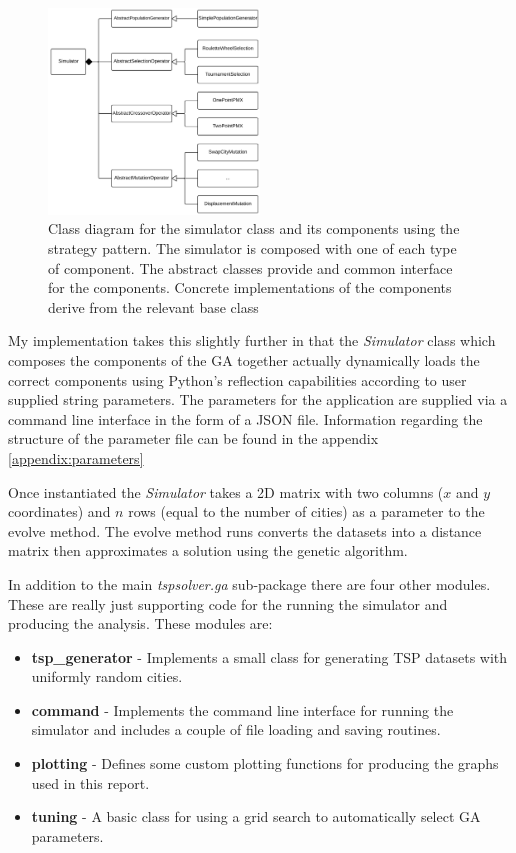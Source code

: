 \documentclass[journal]{IEEEtran}
\begin{document}
\begin{figure}[H]
\centering
\includegraphics[width=0.5\textwidth]{img/class_diagram.png}
\caption{Class diagram for the simulator class and its components using the strategy pattern. The simulator is composed with one of each type of component. The abstract classes provide and common interface for the components. Concrete implementations of the components derive from the relevant base class}
\label{fig:class-diagram}
\end{figure}


My implementation takes this slightly further in that the \textit{Simulator} class which composes the components of the GA together actually dynamically loads the correct components using Python's reflection capabilities according to user supplied string parameters. The parameters for the application are supplied via a command line interface in the form of a JSON file. Information regarding the structure of the parameter file can be found in the appendix \ref{appendix:parameters}

Once instantiated the \textit{Simulator} takes a 2D matrix with two columns ($x$ and $y$ coordinates) and $n$ rows (equal to the number of cities) as a parameter to the evolve method. The evolve method runs converts the datasets into a distance matrix then approximates a solution using the genetic algorithm.

In addition to the main \textit{tspsolver.ga} sub-package there are four other modules. These are really just supporting code for the running the simulator and producing the analysis. These modules are:

\begin{itemize}
	\item \textbf{tsp\_generator} - Implements a small class for generating TSP datasets with uniformly random cities.
	\item \textbf{command} - Implements the command line interface for running the simulator and includes a couple of file loading and saving routines.
	\item \textbf{plotting} - Defines some custom plotting functions for producing the graphs used in this report.
	\item \textbf{tuning} - A basic class for using a grid search to automatically select GA parameters.
\end{itemize}
\end{document}
